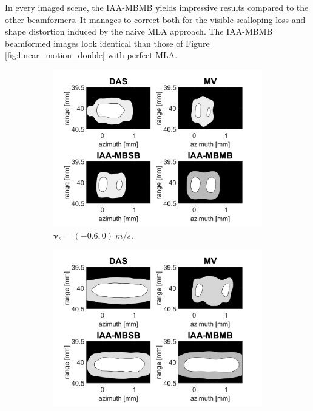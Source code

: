 In every imaged scene, the IAA-MBMB yields impressive results compared to the other beamformers.
It manages to correct both for the visible scalloping loss and shape distortion induced by the naive MLA approach.
The IAA-MBMB beamformed images look identical than those of Figure \ref{fig:linear_motion_double} with perfect MLA.


\begin{figure}[ht]
    \centering
    \begin{subfigure}[t]{0.48\linewidth}
        \includegraphics[width=\linewidth]{./images/results/4/motion_0_-06.png}
        \caption{$\boldsymbol{v}_s = (-0.6, 0)~m/s$.}
        \label{fig:mla_a}
    \end{subfigure}
    \quad
    \begin{subfigure}[t]{0.48\linewidth}
        \includegraphics[width=\linewidth]{./images/results/4/motion_0_06.png}

\end{subfigure}
\end{figure}
